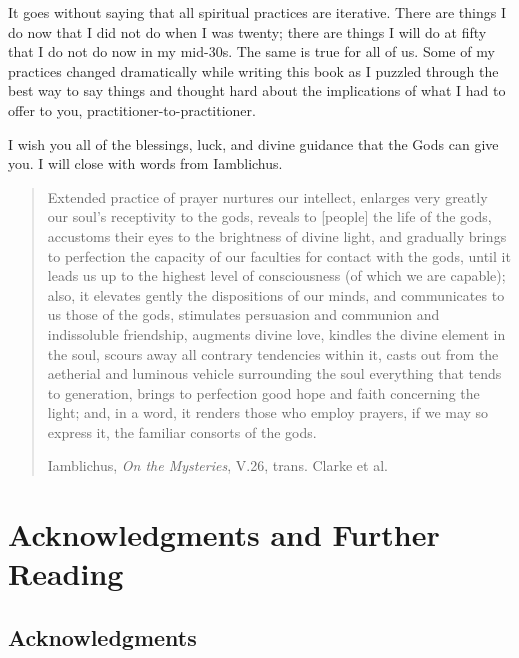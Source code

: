 \documentclass[
]{book}
\begin{document}
It goes without saying that all spiritual practices are iterative. There are things I do now that I did not do when I was twenty; there are things I will do at fifty that I do not do now in my mid-30s. The same is true for all of us. Some of my practices changed dramatically while writing this book as I puzzled through the best way to say things and thought hard about the implications of what I had to offer to you, practitioner-to-practitioner.

I wish you all of the blessings, luck, and divine guidance that the Gods can give you. I will close with words from Iamblichus.

\begin{quote}
Extended practice of prayer nurtures our intellect, enlarges very greatly our soul's receptivity to the gods, reveals to {[}people{]} the life of the gods, accustoms their eyes to the brightness of divine light, and gradually brings to perfection the capacity of our faculties for contact with the gods, until it leads us up to the highest level of consciousness (of which we are capable); also, it elevates gently the dispositions of our minds, and communicates to us those of the gods, stimulates persuasion and communion and indissoluble friendship, augments divine love, kindles the divine element in the soul, scours away all contrary tendencies within it, casts out from the aetherial and luminous vehicle surrounding the soul everything that tends to generation, brings to perfection good hope and faith concerning the light; and, in a word, it renders those who employ prayers, if we may so express it, the familiar consorts of the gods.

Iamblichus, \emph{On the Mysteries}, V.26, trans. Clarke et al.
\end{quote}

\hypertarget{acknowledgments-and-further-reading}{%
\chapter{Acknowledgments and Further Reading}\label{acknowledgments-and-further-reading}}

\hypertarget{acknowledgments}{%
\section{Acknowledgments}\label{acknowledgments}}
\end{document}

